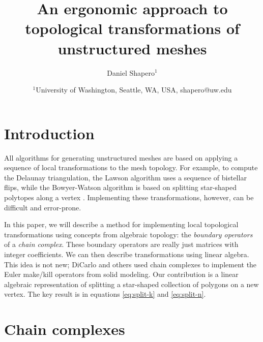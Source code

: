 \documentclass[twocolumn]{article}
\begin{document}
\title{An ergonomic approach to topological transformations of unstructured meshes}
\author{Daniel Shapero$^1$}
\date{
    $^1$University of Washington, Seattle, WA, USA, shapero@uw.edu
}



\maketitle
\thispagestyle{empty}
\pagestyle{empty}


\section{Introduction}

All algorithms for generating unstructured meshes are based on applying a sequence of local transformations to the mesh topology.
For example, to compute the Delaunay triangulation, the Lawson algorithm uses a sequence of bistellar flips, while the Bowyer-Watson algorithm is based on splitting star-shaped polytopes along a vertex \cite{berg1997computational, cheng2013delaunay}.
Implementing these transformations, however, can be difficult and error-prone.

In this paper, we will describe a method for implementing local topological transformations using concepts from algebraic topology: the \emph{boundary operators} of a \emph{chain complex}.
These boundary operators are really just matrices with integer coefficients.
We can then describe transformations using linear algebra.
This idea is not new; DiCarlo and others \cite{dicarlo2007solid} used chain complexes to implement the Euler make/kill operators from solid modeling.
Our contribution is a linear algebraic representation of splitting a star-shaped collection of polygons on a new vertex.
The key result is in equations \eqref{eq:split-k} and \eqref{eq:split-n}.


\section{Chain complexes}
\end{document}
